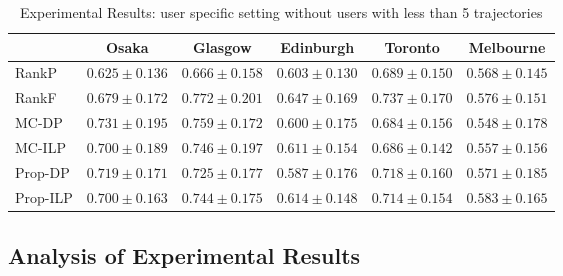 \begin{table*}
\centering
\caption{Experimental Results: user specific setting without users with less than 5 trajectories}
\begin{tabular}{l|ccccc} \hline
 & Osaka & Glasgow & Edinburgh & Toronto & Melbourne \\ \hline
RankP & $0.625\pm0.136$ & $0.666\pm0.158$ & $0.603\pm0.130$ & $0.689\pm0.150$ & $0.568\pm0.145$ \\
RankF & $0.679\pm0.172$ & $\mathbf{0.772\pm0.201}$ & $\mathbf{0.647\pm0.169}$ & $\mathbf{0.737\pm0.170}$ & $0.576\pm0.151$ \\
MC-DP & $\mathbf{0.731\pm0.195}$ & $0.759\pm0.172$ & $0.600\pm0.175$ & $0.684\pm0.156$ & $0.548\pm0.178$ \\
MC-ILP & $0.700\pm0.189$ & $0.746\pm0.197$ & $0.611\pm0.154$ & $0.686\pm0.142$ & $0.557\pm0.156$ \\
Prop-DP & $0.719\pm0.171$ & $0.725\pm0.177$ & $0.587\pm0.176$ & $0.718\pm0.160$ & $0.571\pm0.185$ \\
Prop-ILP & $0.700\pm0.163$ & $0.744\pm0.175$ & $0.614\pm0.148$ & $0.714\pm0.154$ & $\mathbf{0.583\pm0.165}$ \\
\hline
\end{tabular}
\end{table*}


\subsection{Analysis of Experimental Results}
\label{experiment:analysis}
